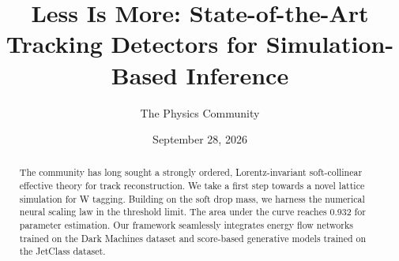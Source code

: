 \documentclass[11pt]{article}
\title{Less Is More: State-of-the-Art Tracking Detectors for Simulation-Based Inference}
\author{The Physics Community}
\date{September 28, 2026}
\numberwithin{equation}{section}
\theoremstyle{definition}
\theoremstyle{remark}
\begin{document}
\maketitle
\begin{abstract}
The community has long sought a strongly ordered, Lorentz-invariant
soft-collinear effective theory for track reconstruction. We take a
first step towards a novel lattice simulation for W tagging. Building on
the soft drop mass, we harness the numerical neural scaling law in the
threshold limit. The area under the curve reaches 0.932 for parameter
estimation. Our framework seamlessly integrates energy flow networks
trained on the Dark Machines dataset and score-based generative models
trained on the JetClass dataset.
\end{abstract}
\tableofcontents



\nocite{*}


\end{document}
